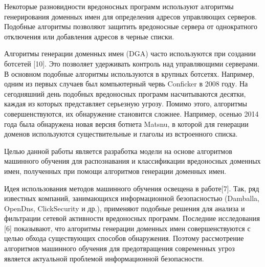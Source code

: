 Некоторые разновидности вредоносных программ используют алгоритмы генерирования доменных имен для определения адресов управляющих серверов. Подобные алгоритмы позволяют защитить вредоносные сервера от однократного отключения или добавления адресов в черные списки.

Алгоритмы генерации доменных имен (DGA) часто используются при создании ботсетей [10]. Это позволяет удерживать контроль над управляющими серверами. В основном подобные алгоритмы используются в крупных ботсетях. Например, одним из первых случаев был компьютерный червь Conficker в 2008 году. На сегодняшний день подобных вредоносных программ насчитываются десятки, каждая из которых представляет серьезную угрозу. Помимо этого, алгоритмы совершенствуются, их обнаружение становится сложнее. Например, осенью 2014 года была обнаружена новая версия ботнета Matsnu, в которой для генерации доменов используются существительные и глаголы из встроенного списка.


Целью данной работы является разработка модели на основе алгоритмов машинного обучения для распознавания и классификации вредоносных доменных имен, полученных при помощи алгоритмов генерации доменных имен.

Идея использования методов машинного обучения освещена в работе[7]. Так, ряд известных компаний, занимающихся информационной безопасностью (Damballa, OpenDns, ClickSecurity и др.), применяют подобные решения для анализа и фильтрации сетевой активности вредоносных программ.
Последние исследования [6] показывают, что алгоритмы генерации доменных имен совершенствуются с целью обхода существующих способов обнаружения. Поэтому рассмотрение алгоритмов машинного обучения для предотвращения современных угроз является актуальной проблемой информационной безопасности.




\clearpage
